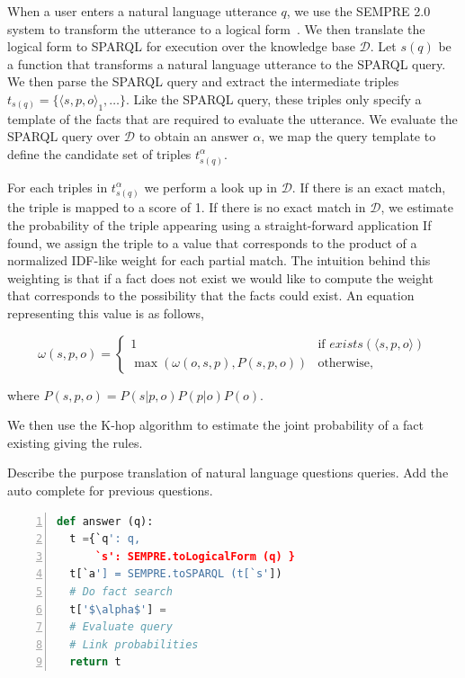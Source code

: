 When a user enters a natural language utterance \(q\), we use the SEMPRE 2.0 system to transform the utterance to a logical form~\cite{berant2013freebase,berant2013semantic}.
We then translate the logical form to SPARQL for execution over the knowledge base \(\mathcal{D}\).
Let \(s(q)\) be a function that transforms a natural language utterance to the SPARQL query.
We then parse the SPARQL query and extract the intermediate triples \( t_{s(q)} = \{\langle s,p,o\rangle_1, \ldots \}\). 
Like the SPARQL query, these triples only specify a template of the facts that are required to evaluate the utterance.
We evaluate the SPARQL query over \(\mathcal{D}\) to obtain an answer \( \alpha \), we map the query template to define the candidate set of triples \( t^\alpha_{s(q)} \).

For each triples in \( t^\alpha_{s(q)} \) we perform a look up in \(\mathcal{D}\).
If there is an exact match, the triple is mapped to a score of 1.
If there is no exact match in \(\mathcal{D}\), we estimate the probability of the triple appearing using a straight-forward application
If found, we assign the triple to a value that corresponds to the product of a normalized IDF-like weight for each partial match.
The intuition behind this weighting is that if a fact does not exist we would like to compute the weight that corresponds to the possibility that the facts could exist.
An equation representing this value is as follows,

\[
  \omega(s,p,o) = \begin{cases}
    1 & \mbox{if } exists(\langle s,p,o \rangle) \\ 
    \max( \omega(o,s,p), P(s,p,o)) & \mbox{otherwise,}
  \end{cases}
\]

where \( P(s,p,o) = P(s|p,o)  P(p|o)  P(o) \).

We then use the K-hop algorithm to estimate the joint probability of a fact existing giving the rules.



Describe the purpose translation of natural language questions queries.
Add the auto complete for previous questions.


\begin{lstlisting}[language=Python,basicstyle=\small,showstringspaces=false,mathescape=true,frame=single,numbers=left,label=probqa-algo,caption={Algorithm for obtaining the information}]
def answer (q):
  t ={`q': q,
      `s': SEMPRE.toLogicalForm (q) }
  t[`a'] = SEMPRE.toSPARQL (t[`s'])
  # Do fact search
  t['$\alpha$'] = 
  # Evaluate query
  # Link probabilities
  return t

\end{lstlisting}



